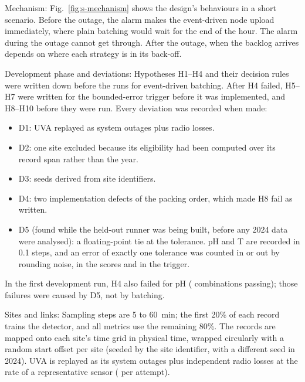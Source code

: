 \documentclass[journal]{IEEEtran}
\begin{document}
Mechanism: Fig.~\ref{fig:s-mechanism} shows the design's behaviours in a short scenario. Before the outage, the alarm makes the event-driven node upload immediately, where plain batching would wait for the end of the hour. The alarm during the outage cannot get through. After the outage, when the backlog arrives depends on where each strategy is in its back-off.

Development phase and deviations: Hypotheses H1--H4 and their decision rules were written down before the runs for event-driven batching. After H4 failed, H5--H7 were written for the bounded-error trigger before it was implemented, and H8--H10 before they were run. Every deviation was recorded when made:
\begin{itemize}
\item D1: UVA replayed as system outages plus radio losses.
\item D2: one site excluded because its eligibility had been computed over its record span rather than the year.
\item D3: seeds derived from site identifiers.
\item D4: two implementation defects of the packing order, which made H8 fail as written.
\item D5 (found while the held-out runner was being built, before any 2024 data were analysed): a floating-point tie at the tolerance. pH and T are recorded in 0.1 steps, and an error of exactly one tolerance was counted in or out by rounding noise, in the scores and in the trigger.
\end{itemize}
In the first development run, H4 also failed for pH (\hFourPassVOne{} combinations passing); those failures were caused by D5, not by batching.

Sites and links: Sampling steps are 5 to 60~min; the first 20\% of each record trains the detector, and all metrics use the remaining 80\%. The records are mapped onto each site's time grid in physical time, wrapped circularly with a random start offset per site (seeded by the site identifier, with a different seed in 2024). UVA is replayed as its system outages plus independent radio losses at the rate of a representative sensor (\uvaSensorFourRadio{} per attempt).
\end{document}
